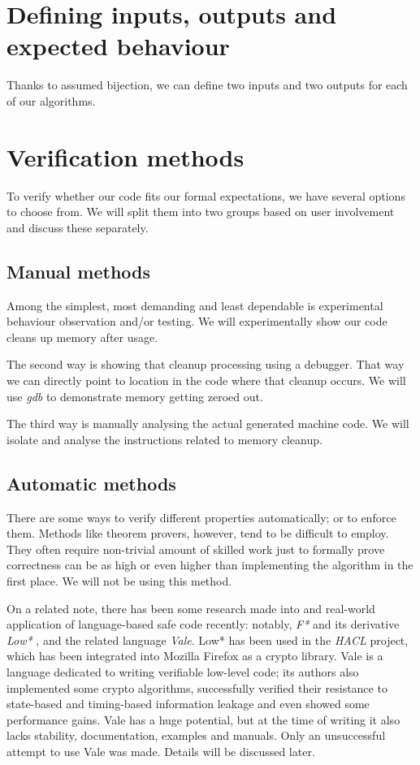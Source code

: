 \documentclass[a4paper,10pt,openright]{memoir}
\newcommand{\term}[1]{\textit{#1}}
\begin{document}
\section{Defining inputs, outputs and expected behaviour}

Thanks to assumed bijection, we can define two inputs and two outputs for each of our algorithms. 

\section{Verification methods}

To verify whether our code fits our formal expectations, we have 
several options to choose from. We will split them into two groups 
based on user involvement and discuss these separately.

\subsection{Manual methods}

Among the simplest, most demanding and least dependable is experimental 
behaviour observation and/or testing. We will experimentally show our 
code cleans up memory after usage.

The second way is showing that cleanup processing using a debugger. 
That way we can directly point to location in the code where that 
cleanup occurs. We will use \term{gdb} to demonstrate memory getting 
zeroed out.

The third way is manually analysing the actual generated machine code. 
We will isolate and analyse the instructions related to memory cleanup.

\subsection{Automatic methods}
\label{sec:verifmet}

There are some ways to verify different properties automatically; or to 
enforce them. Methods like theorem provers, however, tend to be 
difficult to employ. They often require non-trivial amount of skilled 
work just to formally prove correctness can be as high or even higher 
than implementing the algorithm in the first place.  We will not be using this method.

On a related note, there has been some research made into and 
real-world application of language-based safe code recently: notably, 
\term{F*} and its derivative \term{Low*} \cite{Low*}, and the related 
language \term{Vale}\cite{vale2017}. Low* has been used in the 
\term{HACL} project, which has been integrated into Mozilla Firefox as 
a crypto library. Vale is a language dedicated to writing verifiable 
low-level code; its authors also implemented some crypto algorithms, 
successfully verified their resistance to state-based and timing-based 
information leakage and even showed some performance gains. Vale has a 
huge potential, but at the time of writing it also lacks stability, 
documentation, examples and manuals. Only an unsuccessful attempt to 
use Vale was made. Details will be discussed later. 
\end{document}
